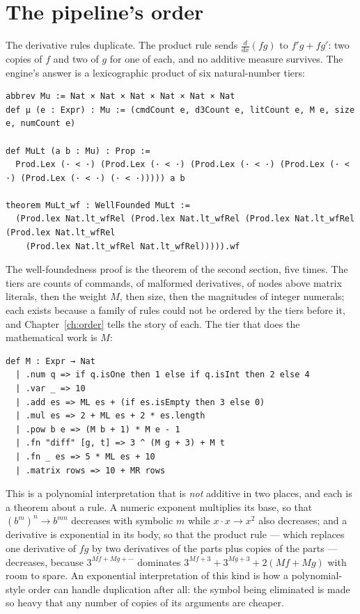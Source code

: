 \section{The pipeline's order}

The derivative rules duplicate. The product rule sends $\frac{d}{dx}(fg)$ to $f'g + fg'$: two
copies of $f$ and two of $g$ for one of each, and no additive measure survives. The engine's
answer is a lexicographic product of six natural-number tiers:

\begin{verbatim}
abbrev Mu := Nat × Nat × Nat × Nat × Nat × Nat
def μ (e : Expr) : Mu := (cmdCount e, d3Count e, litCount e, M e, size e, numCount e)

def MuLt (a b : Mu) : Prop :=
  Prod.Lex (· < ·) (Prod.Lex (· < ·) (Prod.Lex (· < ·) (Prod.Lex (· < ·) (Prod.Lex (· < ·) (· < ·))))) a b

theorem MuLt_wf : WellFounded MuLt :=
  (Prod.lex Nat.lt_wfRel (Prod.lex Nat.lt_wfRel (Prod.lex Nat.lt_wfRel (Prod.lex Nat.lt_wfRel
    (Prod.lex Nat.lt_wfRel Nat.lt_wfRel))))).wf
\end{verbatim}

The well-foundedness proof is the theorem of the second section, five times. The tiers are
counts of commands, of malformed derivatives, of nodes above matrix literals, then the weight
$M$, then size, then the magnitudes of integer numerals; each exists because a family of rules
could not be ordered by the tiers before it, and Chapter~\ref{ch:order} tells the story of each.
The tier that does the mathematical work is $M$:

\begin{verbatim}
def M : Expr → Nat
  | .num q => if q.isOne then 1 else if q.isInt then 2 else 4
  | .var _ => 10
  | .add es => ML es + (if es.isEmpty then 3 else 0)
  | .mul es => 2 + ML es + 2 * es.length
  | .pow b e => (M b + 1) * M e - 1
  | .fn "diff" [g, t] => 3 ^ (M g + 3) + M t
  | .fn _ es => 5 * ML es + 10
  | .matrix rows => 10 + MR rows
\end{verbatim}

This is a polynomial interpretation that is \emph{not} additive in two places, and each is a
theorem about a rule. A numeric exponent multiplies its base, so that $(b^m)^n \to b^{mn}$
decreases with symbolic $m$ while $x \cdot x \to x^2$ also decreases; and a derivative is
exponential in its body, so that the product rule --- which replaces one derivative of $fg$ by two
derivatives of the parts plus copies of the parts --- decreases, because $3^{M f + M g + \cdots}$
dominates $3^{M f + 3} + 3^{M g + 3} + 2(M f + M g)$ with room to spare. An exponential
interpretation of this kind is how a polynomial-style order can handle duplication after all: the
symbol being eliminated is made so heavy that any number of copies of its arguments are cheaper.

